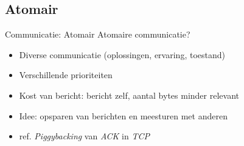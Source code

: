 \documentclass{beamer}
\begin{document}
\subsection{Atomair}
\begin{frame}{Communicatie: Atomair}
Atomaire communicatie?
\begin{itemize}
 \item Diverse communicatie (oplossingen, ervaring, toestand)
 \item Verschillende prioriteiten
 \item Kost van bericht: bericht zelf, aantal bytes minder relevant
 \item Idee: opsparen van berichten en meesturen met anderen
 \item ref. \emph{Piggybacking} van \emph{ACK} in \emph{TCP}
\end{itemize}
\end{frame}
\end{document}
